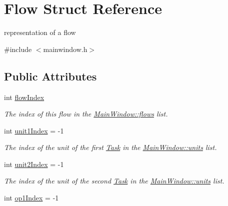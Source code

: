 \hypertarget{struct_flow}{}\section{Flow Struct Reference}
\label{struct_flow}


representation of a flow  




{\ttfamily \#include $<$mainwindow.\+h$>$}

\subsection*{Public Attributes}
\begin{DoxyCompactItemize}
\item 
\hypertarget{struct_flow_a0cc5ede8dd792ee075b3974ccc6c70e7}{}int \hyperlink{struct_flow_a0cc5ede8dd792ee075b3974ccc6c70e7}{flow\+Index}\label{struct_flow_a0cc5ede8dd792ee075b3974ccc6c70e7}

\begin{DoxyCompactList}\small\item\em The index of this flow in the \hyperlink{class_main_window_a843068e01d54730258357a4bc5f29bac}{Main\+Window\+::flows} list. \end{DoxyCompactList}\item 
\hypertarget{struct_flow_a3272e1f0ab6863ad902be6022fb9c537}{}int \hyperlink{struct_flow_a3272e1f0ab6863ad902be6022fb9c537}{unit1\+Index} = -\/1\label{struct_flow_a3272e1f0ab6863ad902be6022fb9c537}

\begin{DoxyCompactList}\small\item\em The index of the unit of the first \hyperlink{struct_task}{Task} in the \hyperlink{class_main_window_aad7505c53a0ad219080b3c1b1d1ef1e6}{Main\+Window\+::units} list. \end{DoxyCompactList}\item 
\hypertarget{struct_flow_a0e6209bf9cb7c20c6b3e8eff36c12527}{}int \hyperlink{struct_flow_a0e6209bf9cb7c20c6b3e8eff36c12527}{unit2\+Index} = -\/1\label{struct_flow_a0e6209bf9cb7c20c6b3e8eff36c12527}

\begin{DoxyCompactList}\small\item\em The index of the unit of the second \hyperlink{struct_task}{Task} in the \hyperlink{class_main_window_aad7505c53a0ad219080b3c1b1d1ef1e6}{Main\+Window\+::units} list. \end{DoxyCompactList}\item 
\hypertarget{struct_flow_a9f4a4871be5366c83e9d870781d396b6}{}int \hyperlink{struct_flow_a9f4a4871be5366c83e9d870781d396b6}{op1\+Index} = -\/1\label{struct_flow_a9f4a4871be5366c83e9d870781d396b6}


\end{DoxyCompactItemize}
